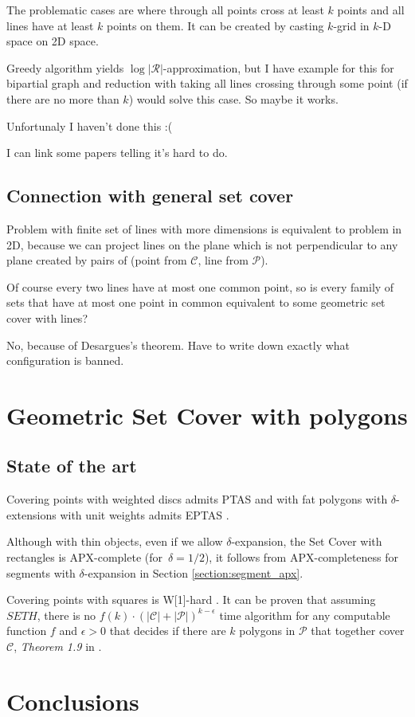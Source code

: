 \documentclass[en]{pracamgr}
\newcommand{\points}{\mathcal{C}}
\newcommand{\sets}{\mathcal{P}}
\theoremstyle{plain}
\theoremstyle{definition}
\begin{document}
The problematic cases are where through all points
cross at least $k$ points and all lines have at least $k$ points on them.
It can be created by casting $k$-grid in $k$-D space on 2D space.

Greedy algorithm yields $\log |\mathcal{R}|$-approximation,
but I have example for this for bipartial graph and
reduction with taking all lines crossing through some point
(if there are no more than $k$) would solve this case.
So maybe it works.

Unfortunaly I haven't done this :(

I can link some papers telling it's hard to do.

\section{Connection with general set cover}
Problem with finite set of lines with more dimensions
is equivalent
to problem in 2D, because we can project
lines on the plane which is not perpendicular
to any plane created by pairs of
(point from $\mathcal{C}$, line from $\mathcal{P}$).

Of course every two lines have at most one common point,
so is every family of sets that have at most one point
in common equivalent to some geometric set cover with lines?

No, because of Desargues's theorem.
Have to write down exactly what configuration is banned.


\chapter{Geometric Set Cover with polygons}
\section{State of the art}

Covering points with weighted discs admits PTAS \cite{li}
and with fat polygons with $\delta$-extensions with unit weights
admits EPTAS \cite{harpeled12}.

Although with thin objects, even if we allow $\delta$-expansion,
the Set Cover with rectangles
is APX-complete (for~$\delta = 1/2$),
it follows from APX-completeness for segments with $\delta$-expansion
in Section \ref{section:segment_apx}.

Covering points with squares is W[1]-hard \cite{marx05}.
It can be proven that assuming $SETH$,
there is no $f(k)\cdot(|\points|+|\sets|)^{k-\epsilon}$ time algorithm
for any computable function $f$ and $\epsilon >0$ that decides if there
are $k$ polygons in $\sets$ that together cover $\points$,
\textit{Theorem 1.9} in \cite{voronoi}.









\chapter{Conclusions}




\end{document}
